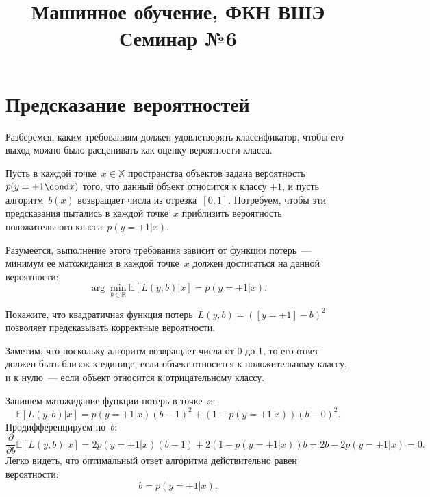 \documentclass[12pt,a4paper]{article}
\title{Машинное обучение, ФКН ВШЭ\\Семинар №6}
\author{}
\date{}
\begin{document}
	\maketitle
\section{Предсказание вероятностей}
\par Разберемся, каким требованиям должен удовлетворять классификатор, чтобы его выход можно было расценивать как оценку вероятности класса.

\par Пусть в каждой точке~$x \in \mathbb{X}$ пространства объектов
задана вероятность~$p(y=+1 \cond x)$ того, что данный объект относится
к классу $+1$, и пусть алгоритм~$b(x)$ возвращает числа из отрезка~$[0, 1]$. Потребуем, чтобы эти предсказания пытались в каждой точке~$x$ приблизить вероятность положительного класса~$p(y = +1 | x)$.
\par Разумеется, выполнение этого требования зависит от функции потерь~---
минимум ее матожидания в каждой точке~$x$ должен достигаться на данной вероятности:
$$\arg \min_{b \in \mathbb{R}} \mathbb{E} \left[ L(y, b)|x \right] = p(y=+1|x).$$

\begin{vkProblem}
	Покажите, что квадратичная функция потерь~$L(y, b) = ([y = +1] - b)^2$
	позволяет предсказывать корректные вероятности.
\end{vkProblem}


\begin{esSolution}
	Заметим, что поскольку алгоритм возвращает числа от 0 до 1,
	то его ответ должен быть близок к единице, если объект относится
	к положительному классу, и к нулю~--- если объект относится
	к отрицательному классу.
	
	Запишем матожидание функции потерь в точке~$x$:
	$$\mathbb{E} \left[ L(y, b)|x\right] = p(y=+1|x)(b-1)^2 + (1 - p(y=+1|x))(b-0)^2.$$
	Продифференцируем по~$b$:
	$$\frac{\partial}{\partial b}
	\mathbb{E} \left[
	L(y, b)
	|
	x
	\right] =
	2 p(y = +1 | x) (b - 1)
	+
	2 (1 - p(y = +1 | x)) b
	=
	2b - 2p(y = +1 | x)
	=
	0.$$
	Легко видеть, что оптимальный ответ алгоритма действительно
	равен вероятности:
	$$b = p(y = +1 | x).$$
\end{esSolution}
\end{document}
